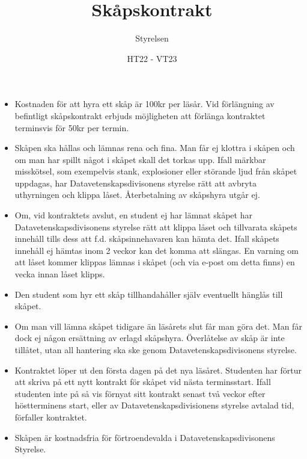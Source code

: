 \documentclass{dvd}
\begin{document}
	\title{Skåpskontrakt}
	\author{Styrelsen}
	\date{HT22 - VT23}

	\begin{itemize}
	    \item Kostnaden för att hyra ett skåp är 100kr per läsår.
	    Vid förlängning av befintligt skåpskontrakt erbjuds möjligheten att förlänga kontraktet terminsvis för 50kr per termin.

	    \item Skåpen ska hållas och lämnas rena och fina.
	    Man får ej klottra i skåpen och om man har spillt något i skåpet skall det torkas upp. Ifall märkbar misskötsel, som exempelvis stank, explosioner eller störande ljud från skåpet uppdagas, har Datavetenskapsdivisonens styrelse rätt att avbryta uthyrningen och klippa låset.
	    Återbetalning av skåpshyra utgår ej.

	    \item Om, vid kontraktets avslut, en student ej har lämnat skåpet har Datavetenskapsdivisonens styrelse rätt att klippa låset och tillvarata skåpets innehåll tills dess att f.d. skåpsinnehavaren kan hämta det.
	    Ifall skåpets innehåll ej hämtas inom 2 veckor kan det komma att slängas.
	    En varning om att låset kommer klippas lämnas i skåpet (och via e-post om detta finns) en vecka innan låset klipps.

	    \item Den student som hyr ett skåp tillhandahåller själv eventuellt hänglås till skåpet.

	    \item Om man vill lämna skåpet tidigare än läsårets slut får man göra det.
	    Man får dock ej någon ersättning av erlagd skåpshyra.
	    Överlåtelse av skåp är inte tillåtet, utan all hantering ska ske genom Datavetenskapsdivisonens styrelse.

	    \item  Kontraktet löper ut den första dagen på det nya läsåret.
	    Studenten har förtur att skriva på ett nytt kontrakt för skåpet vid nästa terminsstart.
	    Ifall studenten inte på så vis förnyat sitt kontrakt senast två veckor efter höstterminens start, eller av Datavetenskapsdivisionens styrelse avtalad tid, förfaller kontraktet.

	    \item Skåpen är kostnadsfria för förtroendevalda i Datavetenskapsdivisonens Styrelse.
	\end{itemize}
\end{document}

